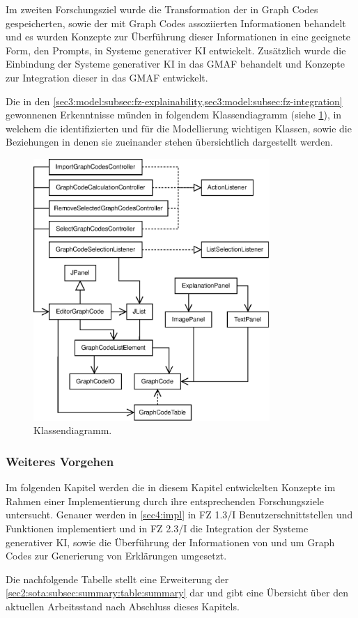Im zweiten Forschungsziel wurde die Transformation der in Graph Codes gespeicherten, sowie der mit Graph Codes assoziierten Informationen behandelt und es wurden Konzepte zur Überführung dieser Informationen in eine geeignete Form, den Prompts, in Systeme generativer KI entwickelt.
Zusätzlich wurde die Einbindung der Systeme generativer KI in das GMAF behandelt und Konzepte zur Integration dieser in das GMAF entwickelt.

Die in den \cref{sec3:model:subsec:fz-explainability,sec3:model:subsec:fz-integration} gewonnenen Erkenntnisse münden in folgendem Klassendiagramm (siehe \cref{sec3:model:subsec:summary:fig:class-diagram}), in welchem die identifizierten und für die Modellierung wichtigen Klassen, sowie die Beziehungen in denen sie zueinander stehen übersichtlich dargestellt werden.

\begin{figure}[htb]
  \centering
  \includegraphics[width=0.8\textwidth]{chapter/chapter_3/class.eps}
  \caption{Klassendiagramm.}
  \label{sec3:model:subsec:summary:fig:class-diagram}
\end{figure}

\FloatBarrier

\subsubsection{Weiteres Vorgehen}
\label{sec3:model:subsubsec:futher-approach}
Im folgenden Kapitel werden die in diesem Kapitel entwickelten Konzepte im Rahmen einer Implementierung durch ihre entsprechenden Forschungsziele untersucht.
Genauer werden in \cref{sec4:impl} in FZ 1.3/I Benutzerschnittstellen und Funktionen implementiert und in FZ 2.3/I die Integration der Systeme generativer KI, sowie die Überführung der Informationen von und um Graph Codes zur Generierung von Erklärungen umgesetzt.

Die nachfolgende Tabelle stellt eine Erweiterung der \cref{sec2:sota:subsec:summary:table:summary} dar und gibt eine Übersicht über den aktuellen Arbeitsstand nach Abschluss dieses Kapitels.


